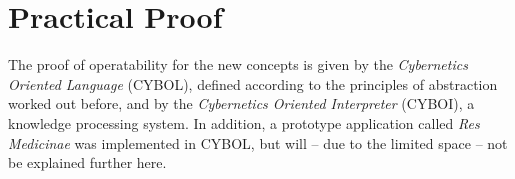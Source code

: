 %
%
%
%
%
%
%

\section{Practical Proof}
\label{practical_proof_heading}

The proof of operatability for the new concepts is given by the
\emph{Cybernetics Oriented Language} (CYBOL), defined according to the
principles of abstraction worked out before, and by the
\emph{Cybernetics Oriented Interpreter} (CYBOI), a knowledge processing system.
In addition, a prototype application called \emph{Res Medicinae}
\cite{resmedicinae} was implemented in CYBOL, but will -- due to the limited
space -- not be explained further here.





